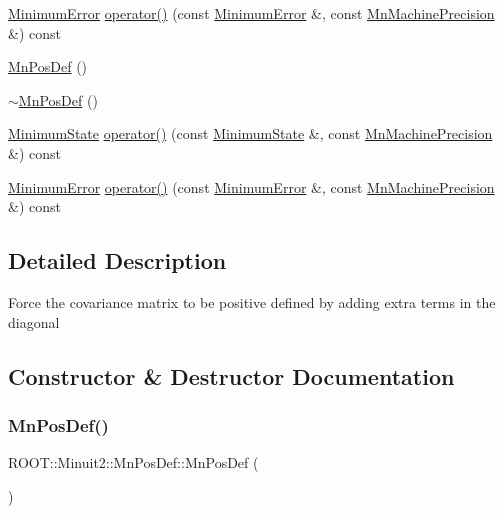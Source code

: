 \begin{DoxyCompactItemize}
\item 
\mbox{\hyperlink{classROOT_1_1Minuit2_1_1MinimumError}{Minimum\+Error}} \mbox{\hyperlink{classROOT_1_1Minuit2_1_1MnPosDef_ace62b61f17edf0c57ef824003b99b9ec}{operator()}} (const \mbox{\hyperlink{classROOT_1_1Minuit2_1_1MinimumError}{Minimum\+Error}} \&, const \mbox{\hyperlink{classROOT_1_1Minuit2_1_1MnMachinePrecision}{Mn\+Machine\+Precision}} \&) const
\item 
\mbox{\hyperlink{classROOT_1_1Minuit2_1_1MnPosDef_a937f62100fca6ac5e8f32c882639be9c}{Mn\+Pos\+Def}} ()
\item 
\mbox{\hyperlink{classROOT_1_1Minuit2_1_1MnPosDef_a1bc55c7ddd347c0f7834b7d64a62b964}{$\sim$\+Mn\+Pos\+Def}} ()
\item 
\mbox{\hyperlink{classROOT_1_1Minuit2_1_1MinimumState}{Minimum\+State}} \mbox{\hyperlink{classROOT_1_1Minuit2_1_1MnPosDef_a5a550c841e9b62d3c09cdf9df61a88f4}{operator()}} (const \mbox{\hyperlink{classROOT_1_1Minuit2_1_1MinimumState}{Minimum\+State}} \&, const \mbox{\hyperlink{classROOT_1_1Minuit2_1_1MnMachinePrecision}{Mn\+Machine\+Precision}} \&) const
\item 
\mbox{\hyperlink{classROOT_1_1Minuit2_1_1MinimumError}{Minimum\+Error}} \mbox{\hyperlink{classROOT_1_1Minuit2_1_1MnPosDef_ace62b61f17edf0c57ef824003b99b9ec}{operator()}} (const \mbox{\hyperlink{classROOT_1_1Minuit2_1_1MinimumError}{Minimum\+Error}} \&, const \mbox{\hyperlink{classROOT_1_1Minuit2_1_1MnMachinePrecision}{Mn\+Machine\+Precision}} \&) const
\end{DoxyCompactItemize}


\subsection{Detailed Description}
Force the covariance matrix to be positive defined by adding extra terms in the diagonal 

\subsection{Constructor \& Destructor Documentation}
\mbox{\label{classROOT_1_1Minuit2_1_1MnPosDef_a937f62100fca6ac5e8f32c882639be9c}} 
\subsubsection{\texorpdfstring{MnPosDef()}{MnPosDef()}\hspace{0.1cm}{\footnotesize\ttfamily [1/3]}}
{\footnotesize\ttfamily R\+O\+O\+T\+::\+Minuit2\+::\+Mn\+Pos\+Def\+::\+Mn\+Pos\+Def (\begin{DoxyParamCaption}{ }\end{DoxyParamCaption})\hspace{0.3cm}{\ttfamily [inline]}}

